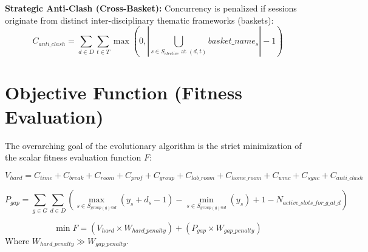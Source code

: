 \documentclass[12pt,a4paper]{article}
\begin{document}
\textbf{Strategic Anti-Clash (Cross-Basket):} Concurrency is penalized if sessions originate from distinct inter-disciplinary thematic frameworks (baskets):
\begin{equation}
    C_{anti\_clash} = \sum_{d \in D} \sum_{t \in T} \max\left(0, |\bigcup_{s \in S_{elective} \text{ at } (d,t)} basket\_name_s| - 1\right)
\end{equation}

\section{Objective Function (Fitness Evaluation)}
The overarching goal of the evolutionary algorithm is the strict minimization of the scalar fitness evaluation function $F$:

\begin{equation}
    V_{hard} = C_{time} + C_{break} + C_{room} + C_{prof} + C_{group} + C_{lab\_room} + C_{home\_room} + C_{wmc} + C_{sync} + C_{anti\_clash}
\end{equation}

\begin{equation}
    P_{gap} = \sum_{g \in G} \sum_{d \in D} \left( \max_{s \in S_{group(g)@d}}(y_s + d_s - 1) - \min_{s \in S_{group(g)@d}}(y_s) + 1 - N_{active\_slots\_for\_g\_at\_d} \right)
\end{equation}

\begin{equation}
    \min F = (V_{hard} \times W_{hard\_penalty}) + (P_{gap} \times W_{gap\_penalty})
\end{equation}
Where $W_{hard\_penalty} \gg W_{gap\_penalty}$.
\end{document}
